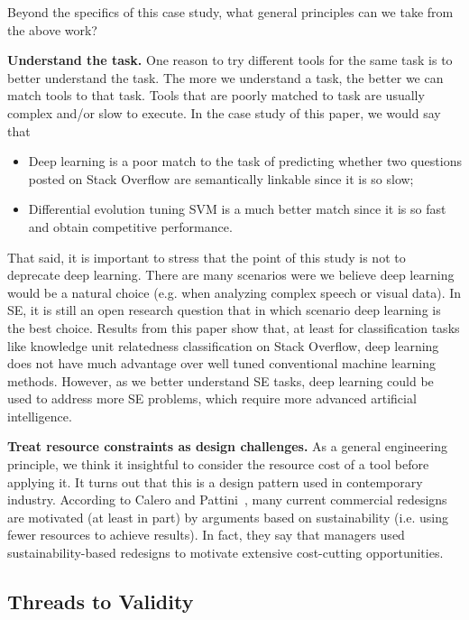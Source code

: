 \documentclass[sigconf]{acmart}
\theoremstyle{break}
\newcommand{\bi}{\begin{itemize}[leftmargin=0.4cm]}
\newcommand{\ei}{\end{itemize}}
\begin{document}
Beyond the specifics of this case study, what general principles
can we take from the above work?

\textbf{Understand the task.}
One reason to try different tools for the same task is to better
understand the task.
The more we understand a task, the better we can match tools to that task. Tools that are poorly matched to task are usually complex and/or slow to execute.  In the case study of this paper, we would say that

\bi
\item
Deep learning is a poor match to the task of predicting whether two questions posted on Stack Overflow are semantically linkable
since it is so slow;
\item
Differential evolution tuning SVM is a much better match since it is so fast and obtain competitive performance.
\ei
That said, 
it  is important to stress that the point of this study
is not to deprecate deep learning.  
There are many scenarios were we
 believe  deep learning would be a natural
 choice (e.g. when analyzing complex speech or visual data). 
 In SE, it is still an open research question that in which scenario deep learning
 is the best choice. Results from this paper show that, at least for classification tasks like 
 knowledge unit relatedness classification on Stack Overflow,
 deep learning does not have much advantage over well tuned conventional machine learning methods. 
However, as we better understand SE tasks, deep learning could be used to address more SE problems,
which require more advanced artificial intelligence. 





\textbf{Treat resource constraints as design challenges.}
As a general engineering principle,
we think it insightful to consider the resource cost
of a tool before applying it.
It turns out that this is a design pattern used in contemporary industry.
According to Calero and Pattini~\cite{calero2015green},  many current commercial  redesigns are motivated (at least in part) by arguments based on sustainability (i.e. using fewer resources to achieve results).
In fact, they say that managers used sustainability-based redesigns to 
motivate extensive cost-cutting opportunities. 

 


 
\subsection{Threads to Validity}
\end{document}
